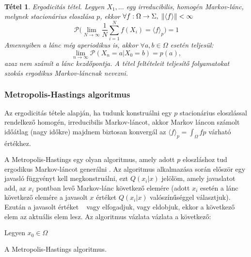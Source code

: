 \documentclass[11pt,a4paper]{article}
\numberwithin{equation}{subsection}
\numberwithin{figure}{section}
\newtheorem{theorem}{Tétel}[section]
\begin{document}
\begin{theorem}{Ergodicitás tétel.}
Legyen $X_1,\dots$ egy irreducibilis, homogén Markov-lánc, melynek stacionárius eloszlása  $p$, ekkor  
$\forall f:\Omega\rightarrow\Sigma ,\;\norm{\langle f\rangle}<\infty$
\begin{equation}
\mathcal{P}\Bigg(\lim_{N\rightarrow\infty}\frac{1}{N}\sum_{i=1}^Nf(X_i)=\langle f \rangle_p\Bigg)=1
\end{equation}
Amennyiben a lánc még aperiodikus is, akkor $\forall a,b\in\Omega$ esetén teljesül: 
\begin{equation}
\lim_{n\rightarrow\infty}\mathcal{P}(X_n=a|X_0=b) = p(a),
\end{equation}
azaz nem számít a lánc kezdőpontja. A tétel feltételeit teljesítő folyamatokat szokás ergodikus Markov-láncnak nevezni.
\end{theorem}


\subsubsection{Metropolis-Hastings algoritmus}

Az ergodicitás tétele alapján, ha tudunk konstruálni egy $p$ stacionárius eloszlással rendelkező homogén, irreducibilis Markov-láncot, akkor Markov láncon számolt időátlag (nagy időkre) majdnem biztosan konvergál az $\langle f \rangle_p=\int_\Omega fp$ várható értékhez.

A Metropolis-Hastings egy olyan algoritmus, amely adott $p$ eloszláshoz tud ergodikus Markov-láncot generálni \cite{Metropolis}. Az algoritmus alkalmazása során először egy javasló függvényt kell megkonstruálni, ezt $Q(x_i|x)$ jelölöm, amely javaslatot add, az $x_i$ pontban levő Markov-lánc következő elemére (adott $x_i$ esetén a lánc következő elemére a javasolt $x$ értéket $Q(x_i|x)$ valószínűséggel választjuk). Ezután a javasolt értéket ~ vagy elfogadjuk, vagy eldobjuk, ekkor a következő elem az aktuális elem lesz. Az algoritmus vázlata vázlata  a következő:

\begin{center}
\begin{algorithm}[H]
Legyen $x_0\in \Omega$\;
 \caption{A Metropolis-Hastings algoritmus.}
 \label{alg:MH}
\end{algorithm}
\end{center}
\end{document}
